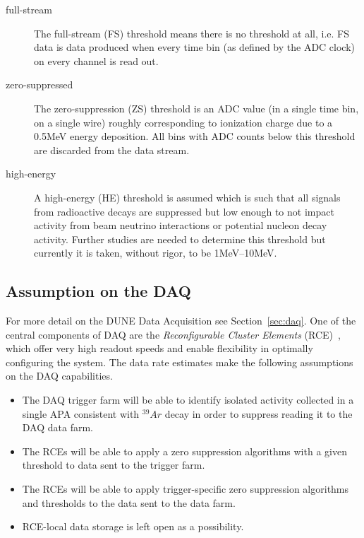 \begin{description}
	
\item[full-stream] The full-stream (FS) threshold means there is no threshold at all, i.e.
FS data is data produced when every time bin (as defined by the ADC clock) on every channel is read out.

\item[zero-suppressed] The zero-suppression (ZS) threshold is an ADC value (in a single time bin,
on a single wire) roughly corresponding to ionization charge due to a 0.5MeV energy deposition.
All bins with ADC counts below this threshold are discarded from the data stream.

\item[high-energy] A high-energy (HE) threshold is assumed which is
  such that all signals from radioactive decays are suppressed but low
  enough to not impact activity from beam neutrino interactions or
  potential nucleon decay activity.
  Further studies are needed to determine this threshold but currently
  it is taken, without rigor, to be 1MeV--10MeV.
\end{description}


\subsection{Assumption on the DAQ}
For more detail on the DUNE Data Acquisition see Section~\ref{sec:daq}. One of the central components of DAQ are the \textit{Reconfigurable Cluster Elements} (RCE)~\cite{slac_rce_1},
which offer very high readout speeds and enable flexibility in optimally configuring the system.
The data rate estimates make the following assumptions on the DAQ capabilities.

\begin{itemize}
\item The DAQ trigger farm will be able to identify isolated activity
  collected in a single APA consistent with $^{39}Ar$ decay in order
  to suppress reading it to the DAQ data farm.
\item The RCEs will be able to apply a zero suppression
  algorithms with a given threshold to data sent to the trigger farm.
\item The RCEs will be able to apply trigger-specific zero suppression
  algorithms and thresholds to the data sent to the data farm.
\item RCE-local data storage is left open as a possibility.
\end{itemize}

